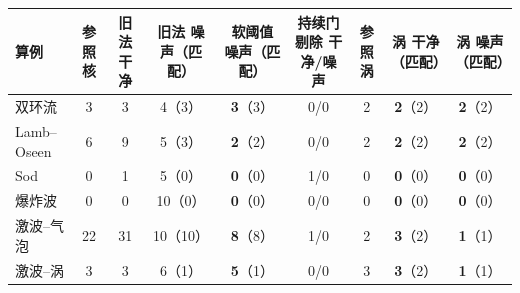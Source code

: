 \begin{tabular}{lcccccccc}\toprule 算例 & 参照核 & 旧法 干净 & 旧法 噪声（匹配） & \textbf{软阈值 噪声}（匹配） & 持续门剔除 干净/噪声 & 参照涡 & \textbf{涡 干净}（匹配） & \textbf{涡 噪声}（匹配）\\\midrule
双环流 & 3 & 3 & 4（3） & \textbf{3}（3） & 0/0 & 2 & \textbf{2}（2） & \textbf{2}（2） \\
Lamb–Oseen & 6 & 9 & 5（3） & \textbf{2}（2） & 0/0 & 2 & \textbf{2}（2） & \textbf{2}（2） \\
Sod & 0 & 1 & 5（0） & \textbf{0}（0） & 1/0 & 0 & \textbf{0}（0） & \textbf{0}（0） \\
爆炸波 & 0 & 0 & 10（0） & \textbf{0}（0） & 0/0 & 0 & \textbf{0}（0） & \textbf{0}（0） \\
激波–气泡 & 22 & 31 & 10（10） & \textbf{8}（8） & 1/0 & 2 & \textbf{3}（2） & \textbf{1}（1） \\
激波–涡 & 3 & 3 & 6（1） & \textbf{5}（1） & 0/0 & 3 & \textbf{3}（2） & \textbf{1}（1） \\
\bottomrule\end{tabular}